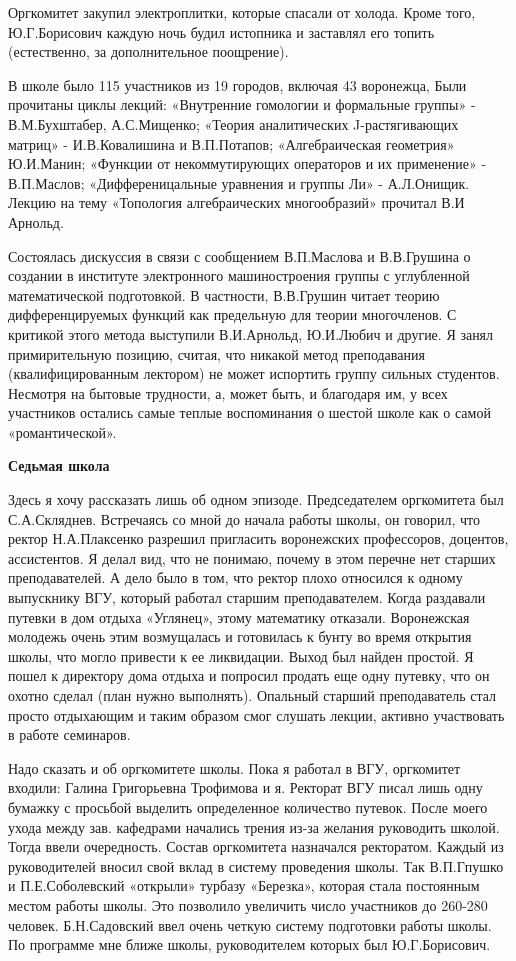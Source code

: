 Оргкомитет закупил электроплитки, которые спасали от холода. Кроме того, Ю.Г.Борисович каждую ночь будил истопника и заставлял его топить (естественно, за дополнительное поощрение).

В школе было 115 участников из 19 городов, включая 43 воронежца, Были прочитаны циклы лекций: «Внутренние гомологии и формальные группы» - В.М.Бухштабер, А.С.Мищенко; «Теория аналитических J-растягивающих матриц» - И.В.Ковалишина и В.П.Потапов; «Алгебраическая геометрия» Ю.И.Манин; «Функции от некоммутирующих операторов и их применение» - В.П.Маслов; «Дифференицальные уравнения и группы Ли» - А.Л.Онищик. Лекцию на тему «Топология алгебраических многообразий» прочитал В.И Арнольд.

Состоялась дискуссия в связи с сообщением В.П.Маслова и В.В.Грушина о создании в институте электронного машиностроения группы с углубленной математической подготовкой. В частности, В.В.Грушин читает теорию дифференцируемых функций как предельную для теории многочленов. С критикой этого метода выступили В.И.Арнольд, Ю.И.Любич и другие. Я занял примирительную позицию, считая, что никакой метод преподавания (квалифицированным лектором) не может испортить группу сильных студентов.
Несмотря на бытовые трудности, а, может быть, и благодаря им, у всех участников остались самые теплые воспоминания о шестой школе как о самой «романтической».

{\bf Седьмая школа}

Здесь я хочу рассказать лишь об одном эпизоде. Председателем оргкомитета был С.А.Скляднев. Встречаясь со мной до начала работы школы, он говорил, что ректор Н.А.Плаксенко разрешил пригласить воронежских профессоров, доцентов, ассистентов. Я делал вид, что не понимаю, почему в этом перечне нет старших преподавателей. А дело было в том, что ректор плохо относился к одному выпускнику ВГУ, который работал старшим преподавателем. Когда раздавали путевки в дом отдыха «Углянец», этому математику отказали. Воронежская молодежь очень этим возмущалась и готовилась к бунту во время открытия школы, что могло привести к ее ликвидации. Выход был найден простой. Я пошел к директору дома отдыха и попросил продать еще одну путевку, что он охотно сделал (план нужно выполнять). Опальный старший преподаватель стал просто отдыхающим и таким образом смог слушать лекции, активно участвовать в работе семинаров.

Надо сказать и об оргкомитете школы. Пока я работал в ВГУ, оргкомитет входили: Галина Григорьевна Трофимова и я. Ректорат ВГУ писал лишь одну бумажку с просьбой выделить определенное количество путевок. После моего ухода между зав. кафедрами начались трения из-за желания руководить школой. Тогда ввели очередность. Состав оргкомитета назначался ректоратом. Каждый из руководителей вносил свой вклад в систему проведения школы. Так В.П.Гпушко и П.Е.Соболевский «открыли» турбазу «Березка», которая стала постоянным местом работы школы. Это позволило увеличить число участников до 260-280 человек. Б.Н.Садовский ввел очень четкую систему подготовки работы школы. По программе мне ближе школы, руководителем которых был Ю.Г.Борисович.

